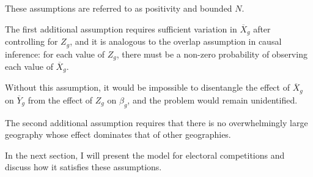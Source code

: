 These assumptions are referred to as positivity and bounded $N$.

The first additional assumption requires sufficient variation in $\overline{X}_g$ after controlling for $Z_g$, and it is analogous to the overlap assumption in causal inference: for each value of $Z_g$, there must be a non-zero probability of observing each value of $\overline{X}_g$.

Without this assumption, it would be impossible to disentangle the effect of $\overline{X}_g$ on $\overline{Y}_g$ from the effect of $Z_g$ on $\beta_g$, and the problem would remain unidentified.

The second additional assumption requires that there is no overwhelmingly large geography whose effect dominates that of other geographies.

In the next section, I will present the model for electoral competitions and discuss how it satisfies these assumptions.